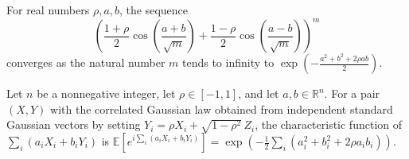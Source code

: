 \begin{lemma}
\label{BooleanAnalysis.GaussianSpace.tendsto_correlatedSignCharacteristic_pow}
\leanok
{}
For real numbers $\rho,a,b$, the sequence
\[
\left(\frac{1+\rho}{2}\cos\left(\frac{a+b}{\sqrt
m}\right)+\frac{1-\rho}{2}\cos\left(\frac{a-b}{\sqrt m}\right)\right)^m
\]
converges as the natural number $m$ tends to infinity to
$\exp\!\left(-\frac{a^2+b^2+2\rho ab}{2}\right)$.
\end{lemma}

\begin{lemma}
\label{BooleanAnalysis.GaussianSpace.integral_exp_correlatedGaussianMeasure}
\leanok
{}
Let $n$ be a nonnegative integer, let $\rho\in[-1,1]$, and let $a,b\in\mathbb R^n$. For
a pair $(X,Y)$ with the correlated Gaussian law obtained from independent standard
Gaussian vectors by setting $Y_i=\rho X_i+\sqrt{1-\rho^2}\,Z_i$, the characteristic
function of $\sum_i(a_iX_i+b_iY_i)$ is $\mathbb
E[e^{i\sum_i(a_iX_i+b_iY_i)}]=\exp\!\left(-\frac12\sum_i(a_i^2+b_i^2+2\rho a_i
b_i)\right)$.
\end{lemma}
